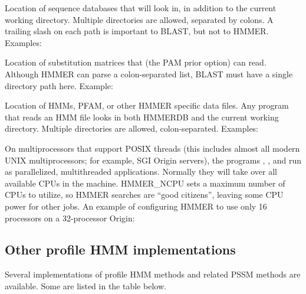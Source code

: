 \begin{wideitem}
\item [\emprog{BLASTDB}] Location of sequence databases that
	 will look in, in addition to the current
	working directory.
	Multiple directories are allowed, separated by colons. A
	trailing slash on each path is important to BLAST, but not to HMMER.\\
	Examples: \\

\item [\emprog{BLASTMAT}] Location of substitution matrices that
	 (the PAM prior option) can read.
	Although HMMER can parse a colon-separated list, BLAST must
	have a single directory path here.
	Example:\\

\item [\emprog{HMMERDB}] Location of HMMs, PFAM, or other HMMER
	specific data files. Any program that reads an HMM file
	looks in both HMMERDB and the current working directory.
	Multiple directories are allowed, colon-separated.
	Examples:\\

\item [\emprog{HMMER\_NCPU}] On multiprocessors that support POSIX
	threads (this includes almost all modern UNIX multiprocessors;
	for example, SGI Origin servers), the programs
	, , and 
	run as parallelized, multithreaded applications.
	Normally they will take over all available CPUs in the machine.
	HMMER\_NCPU sets a maximum number of CPUs to utilize,
	so HMMER searches are ``good citizens'', leaving some
 	CPU power for other jobs. An example of configuring
	HMMER to use only 16 processors on a 32-processor Origin:\\
\end{wideitem}

\subsection{Other profile HMM implementations}

Several implementations of profile HMM methods and related PSSM
methods are available.  Some are listed in the table below.

